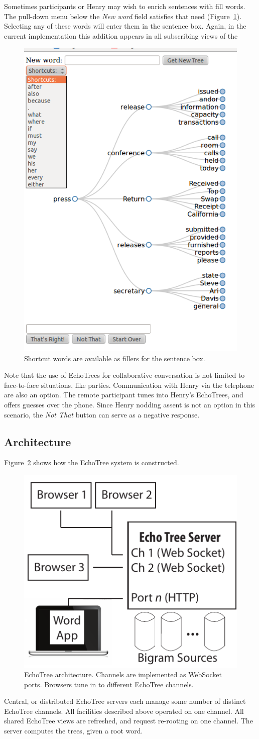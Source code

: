 \documentclass{sigchi}
\begin{document}
Sometimes participants or Henry may wish to enrich sentences with fill
words. The pull-down menu below the {\em New word} field satisfies
that need (Figure~\ref{fig:shortcuts}). Selecting any of these words
will enter them in the sentence box. Again, in the current
implementation this addition appears in all subscribing views of the
\begin{figure}
   \centering
   \includegraphics[width=0.4\columnwidth]{Figs/echoTreePulldownSnapshotSmall.png}
   \caption{Shortcut words are available as fillers for the sentence box.}
   \label{fig:shortcuts}
\end{figure}
Note that the use of EchoTrees for collaborative conversation is not
limited to face-to-face situations, like parties. Communication
with Henry via the telephone are also an option. The remote
participant tunes into Henry's EchoTrees, and offers guesses over the
phone. Since Henry nodding assent is not an option in this scenario,
the {\em Not That} button can serve as a negative response.

\subsection{Architecture}

Figure~\ref{fig:arch} shows how the EchoTree system is
constructed. 
\begin{figure}
   \centering
   \includegraphics[width=0.5\columnwidth]{Figs/echoTreeArch.pdf}
   \caption{EchoTree architecture. Channels are implemented as
     WebSocket ports. Browsers tune in to different EchoTree channels.}
   \label{fig:arch}
\end{figure}
Central, or distributed EchoTree servers each manage some
number of distinct EchoTree channels. All facilities described above
operated on one channel. All shared EchoTree views are refreshed, and
request re-rooting on one channel. The server computes the trees,
given a root word.
\end{document}

